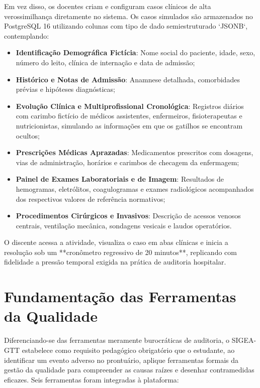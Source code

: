 Em vez disso, os docentes criam e configuram casos clínicos de alta verossimilhança diretamente no sistema. Os casos simulados são armazenados no PostgreSQL 16 utilizando colunas com tipo de dado semiestruturado `JSONB`, contemplando:
\begin{itemize}
    \item \textbf{Identificação Demográfica Fictícia}: Nome social do paciente, idade, sexo, número do leito, clínica de internação e data de admissão;
    \item \textbf{Histórico e Notas de Admissão}: Anamnese detalhada, comorbidades prévias e hipóteses diagnósticas;
    \item \textbf{Evolução Clínica e Multiprofissional Cronológica}: Registros diários com carimbo fictício de médicos assistentes, enfermeiros, fisioterapeutas e nutricionistas, simulando as informações em que os gatilhos se encontram ocultos;
    \item \textbf{Prescrições Médicas Aprazadas}: Medicamentos prescritos com dosagens, vias de administração, horários e carimbos de checagem da enfermagem;
    \item \textbf{Painel de Exames Laboratoriais e de Imagem}: Resultados de hemogramas, eletrólitos, coagulogramas e exames radiológicos acompanhados dos respectivos valores de referência normativos;
    \item \textbf{Procedimentos Cirúrgicos e Invasivos}: Descrição de acessos venosos centrais, ventilação mecânica, sondagens vesicais e laudos operatórios.
\end{itemize}

O discente acessa a atividade, visualiza o caso em abas clínicas e inicia a resolução sob um **cronômetro regressivo de 20 minutos**, replicando com fidelidade a pressão temporal exigida na prática de auditoria hospitalar.

\section{Fundamentação das Ferramentas da Qualidade}
\label{sec_ferramentas_qualidade}

Diferenciando-se das ferramentas meramente burocráticas de auditoria, o SIGEA-GTT estabelece como requisito pedagógico obrigatório que o estudante, ao identificar um evento adverso no prontuário, aplique ferramentas formais da gestão da qualidade para compreender as causas raízes e desenhar contramedidas eficazes. Seis ferramentas foram integradas à plataforma:

